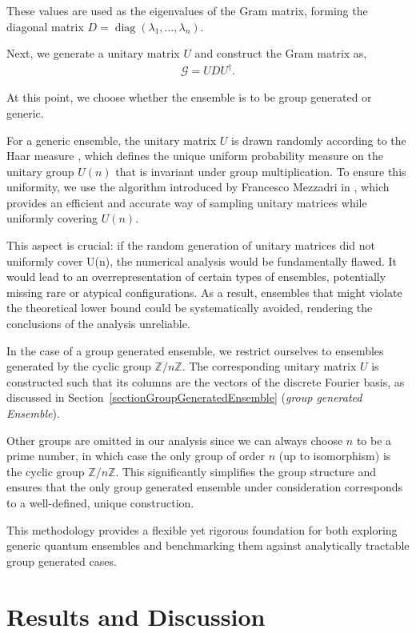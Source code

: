 \documentclass[12pt,letterpaper]{article}
\begin{document}
These values are used as the eigenvalues of the Gram matrix, forming the diagonal matrix $D = \operatorname{diag}(\lambda_1, \dots, \lambda_n)$. 

Next, we generate a unitary matrix $U$ and construct the Gram matrix as,
\begin{align*}
	\mathcal{G} = U D U^\dagger.
\end{align*}

At this point, we choose whether the ensemble is to be group generated or generic.

For a generic ensemble, the unitary matrix $U$ is drawn randomly according to the Haar measure \cite{haarMeasure}, which defines the unique uniform probability measure on the unitary group $U(n)$ that is invariant under group multiplication. To ensure this uniformity, we use the algorithm introduced by Francesco Mezzadri in \cite{UnitaryMatricesGeneration}, which provides an efficient and accurate way of sampling unitary matrices while uniformly covering $U(n)$. 

This aspect is crucial: if the random generation of unitary matrices did not uniformly cover U(n), the numerical analysis would be fundamentally flawed. It would lead to an overrepresentation of certain types of ensembles, potentially missing rare or atypical configurations. As a result, ensembles that might violate the theoretical lower bound could be systematically avoided, rendering the conclusions of the analysis unreliable.

In the case of a group generated ensemble, we restrict ourselves to ensembles generated by the cyclic group $\mathbb{Z}/n\mathbb{Z}$. The corresponding unitary matrix $U$ is constructed such that its columns are the vectors of the discrete Fourier basis, as discussed in Section~\ref{sectionGroupGeneratedEnsemble} (\emph{group generated Ensemble}).

Other groups are omitted in our analysis since we can always choose $n$ to be a prime number, in which case the only group of order $n$ (up to isomorphism) is the cyclic group $\mathbb{Z}/n\mathbb{Z}$. This significantly simplifies the group structure and ensures that the only group generated ensemble under consideration corresponds to a well-defined, unique construction.

This methodology provides a flexible yet rigorous foundation for both exploring generic quantum ensembles and benchmarking them against analytically tractable group generated cases.

\newpage
\section{Results and Discussion}\label{sectionResultsAndDiscussion}
\end{document}
